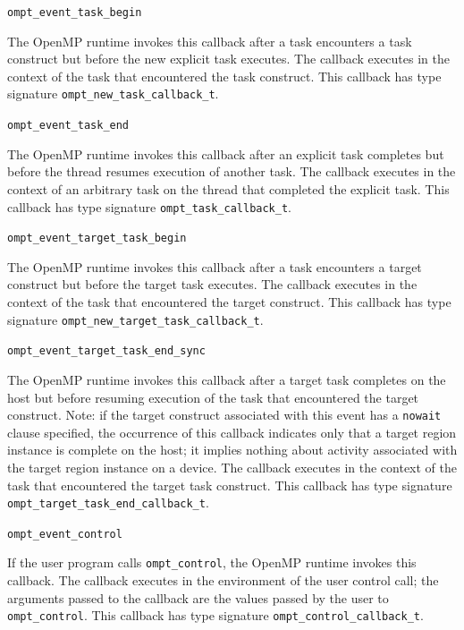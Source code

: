 \documentclass{article}
\newcommand{\descheader}[1]{{\needspace{3\baselineskip}\vspace{1em}\noindent \fbox{#1}}}
\begin{document}
\descheader{Tasks}

\begin{description}

\item \verb|ompt_event_task_begin|
 
The OpenMP runtime invokes this callback
after a task encounters a task construct
but before the new explicit task 
executes. The callback executes in the context of
the task that encountered the task construct.
This callback has type signature \verb|ompt_new_task_callback_t|.

\item \verb|ompt_event_task_end|   
 
\sloppy
The OpenMP runtime invokes this callback
after an explicit task completes 
but before the thread resumes execution of another task.  
The callback executes in the context of an
arbitrary task on the thread that completed the explicit task.
This callback has type signature \verb|ompt_task_callback_t|. 

\item \verb|ompt_event_target_task_begin|
 
The OpenMP runtime invokes this callback after a task encounters a target 
construct but before the target task executes. The callback executes in the 
context of the task that encountered the target construct.
This callback has type signature \verb|ompt_new_target_task_callback_t|.

\item \verb|ompt_event_target_task_end_sync|   
 
\sloppy
The OpenMP runtime invokes this callback after a target task completes on the host but 
before resuming execution of the task that encountered the target construct. Note: if the target construct associated
with this event has a \verb|nowait| clause specified, the occurrence of this callback indicates
only that a target region instance is complete on the host; 
it implies nothing about activity associated with the target region instance on a device.
The callback executes in the context of the task that encountered the target task construct.
This callback has type signature \verb|ompt_target_task_end_callback_t|.

\end{description}


\descheader{Application Tool Control}

\begin{description}

\item \verb|ompt_event_control|

If the user program calls \verb|ompt_control|, the
OpenMP runtime invokes this callback.
The callback executes in the environment
of the user control call; the arguments passed to the callback are the values passed by the user to \verb|ompt_control|.
This callback has type signature \verb|ompt_control_callback_t|. 

\end{description}
\end{document}
